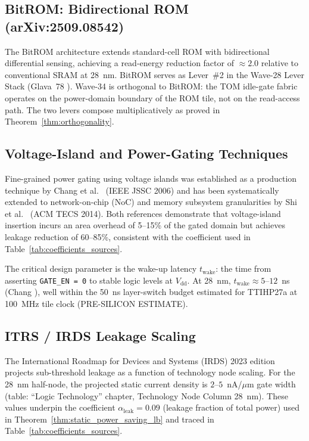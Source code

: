\subsection{BitROM: Bidirectional ROM (arXiv:2509.08542)}

The BitROM architecture \cite{bitrom_2025} extends standard-cell ROM with
bidirectional differential sensing, achieving a read-energy reduction factor
of \(\approx 2.0\) relative to conventional SRAM at 28~nm.  BitROM serves as
Lever~\#2 in the Wave-28 Lever Stack (Glava~78 \cite{glava78_lever_stack}).
Wave-34 is orthogonal to BitROM: the TOM idle-gate fabric operates on the
power-domain boundary of the ROM tile, not on the read-access path.  The two
levers compose multiplicatively as proved in Theorem~\ref{thm:orthogonality}.

\subsection{Voltage-Island and Power-Gating Techniques}

Fine-grained power gating using voltage islands was established as a
production technique by Chang et al.\ \cite{chang_power_gating_2006}
(IEEE JSSC 2006) and has been systematically extended to network-on-chip
(NoC) and memory subsystem granularities by Shi et al.\
\cite{shi_voltage_island_2014} (ACM TECS 2014).  Both references demonstrate
that voltage-island insertion incurs an area overhead of 5--15\% of the gated
domain but achieves leakage reduction of 60--85\%, consistent with the
coefficient used in Table~\ref{tab:coefficients_sources}.

The critical design parameter is the wake-up latency \(t_{\mathrm{wake}}\):
the time from asserting \texttt{GATE\_EN = 0} to stable logic levels at
\(V_{\mathrm{dd}}\).  At 28~nm, \(t_{\mathrm{wake}} \approx 5\)--\(12\)~ns
(Chang \cite{chang_power_gating_2006}), well within the 50~ns layer-switch
budget estimated for TTIHP27a at 100~MHz tile clock (PRE-SILICON ESTIMATE).

\subsection{ITRS / IRDS Leakage Scaling}

The International Roadmap for Devices and Systems (IRDS) 2023 edition
\cite{irds2023} projects sub-threshold leakage as a function of technology
node scaling.  For the 28~nm half-node, the projected static current density
is \(2\)--\(5\)~nA/\(\mu\)m gate width (table: ``Logic Technology''
chapter, Technology Node Column 28~nm).  These values underpin the coefficient
\(\alpha_{\mathrm{leak}} = 0.09\) (leakage fraction of total power) used in
Theorem~\ref{thm:static_power_saving_lb} and traced in
Table~\ref{tab:coefficients_sources}.

